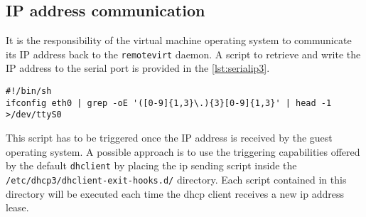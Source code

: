 \subsection{IP address communication}

It is the responsibility of the virtual machine operating system to communicate its IP address back to the \texttt{remotevirt} daemon. A script to retrieve and write the IP address to the serial port is provided in the \autoref{lst:serialip3}.

\begin{lstlisting}
#!/bin/sh
ifconfig eth0 | grep -oE '([0-9]{1,3}\.){3}[0-9]{1,3}' | head -1 >/dev/ttyS0
\end{lstlisting}

This script has to be triggered once the IP address is received by the guest operating system. A possible approach is to use the triggering capabilities offered by the default \texttt{dhclient} by placing the \gls{ip} sending script inside the \texttt{/etc/dhcp3/dhclient-exit-hooks.d/} directory. Each script contained in this directory will be executed each time the \gls{dhcp} client receives a new \gls{ip} address lease.
